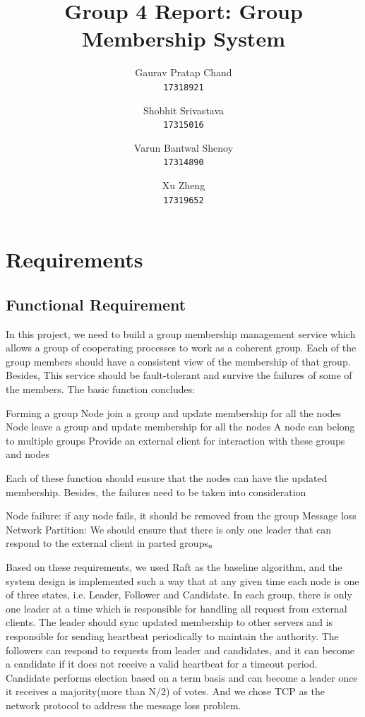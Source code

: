 \documentclass[a4paper,11pt]{article}
\title{Group 4 Report: Group Membership System}
\date{}
\author{
  Gaurav Pratap Chand\\
  \texttt{17318921}
  \and
  Shobhit Srivastava\\
  \texttt{17315016}
  \and
  Varun Bantwal Shenoy\\
  \texttt{17314890}
  \and
  Xu Zheng\\
  \texttt{17319652}
}
\begin{document}
\maketitle

\tableofcontents

\section{Requirements}
\subsection{Functional Requirement}
In this project, we need to build a group membership management service which allows a group of cooperating processes to work as a coherent group. Each of the group members should have a consistent view of the membership of that group. Besides, This service should be fault-tolerant and survive the failures of some of the members. The basic function concludes:
\begin{outline}
\1 Forming a group
\1 Node join a group and update membership for all the nodes
\1 Node leave a group and update membership for all the nodes
\1 A node can belong to multiple groups
\1 Provide an external client for interaction with these groups and nodes
\end{outline}
Each of these function should ensure that the nodes can have the updated membership. Besides, the failures need to be taken into consideration
\begin{outline}
\1 Node failure: if any node fails, it should be removed from the group
\1 Message loss
\1 Network Partition: We should ensure that there is only one leader that can respond to the external client in parted groups。
\end{outline}
Based on these requirements, we used Raft \cite{ongaro2014consensus} as the baseline algorithm, and the system design is implemented such a way that at any given time each node is one of three states, i.e. Leader, Follower and Candidate. In each group, there is only one leader at a time which is responsible for handling all request from external clients. The leader should sync updated membership to other servers and is responsible for sending heartbeat periodically to maintain the authority. The followers can respond to requests from leader and candidates, and it can become a candidate if it does not receive a valid heartbeat for a timeout period. Candidate performs election based on a term basis and can become a leader once it receives a majority(more than N/2) of votes. And we chose TCP as the network protocol to address the message loss problem.
\end{document}
